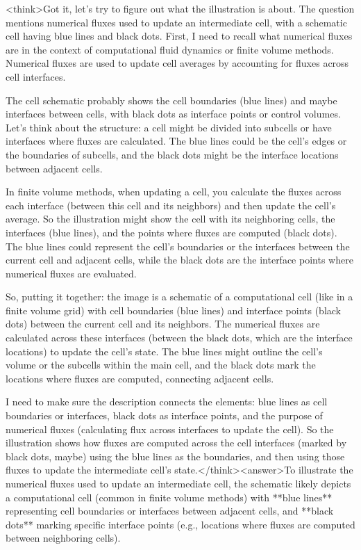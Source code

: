 <think>Got it, let's try to figure out what the illustration is about. The question mentions numerical fluxes used to update an intermediate cell, with a schematic cell having blue lines and black dots. First, I need to recall what numerical fluxes are in the context of computational fluid dynamics or finite volume methods. Numerical fluxes are used to update cell averages by accounting for fluxes across cell interfaces. 

The cell schematic probably shows the cell boundaries (blue lines) and maybe interfaces between cells, with black dots as interface points or control volumes. Let's think about the structure: a cell might be divided into subcells or have interfaces where fluxes are calculated. The blue lines could be the cell's edges or the boundaries of subcells, and the black dots might be the interface locations between adjacent cells. 

In finite volume methods, when updating a cell, you calculate the fluxes across each interface (between this cell and its neighbors) and then update the cell's average. So the illustration might show the cell with its neighboring cells, the interfaces (blue lines), and the points where fluxes are computed (black dots). The blue lines could represent the cell's boundaries or the interfaces between the current cell and adjacent cells, while the black dots are the interface points where numerical fluxes are evaluated. 

So, putting it together: the image is a schematic of a computational cell (like in a finite volume grid) with cell boundaries (blue lines) and interface points (black dots) between the current cell and its neighbors. The numerical fluxes are calculated across these interfaces (between the black dots, which are the interface locations) to update the cell's state. The blue lines might outline the cell's volume or the subcells within the main cell, and the black dots mark the locations where fluxes are computed, connecting adjacent cells. 

I need to make sure the description connects the elements: blue lines as cell boundaries or interfaces, black dots as interface points, and the purpose of numerical fluxes (calculating flux across interfaces to update the cell). So the illustration shows how fluxes are computed across the cell interfaces (marked by black dots, maybe) using the blue lines as the boundaries, and then using those fluxes to update the intermediate cell's state.</think><answer>To illustrate the numerical fluxes used to update an intermediate cell, the schematic likely depicts a computational cell (common in finite volume methods) with **blue lines** representing cell boundaries or interfaces between adjacent cells, and **black dots** marking specific interface points (e.g., locations where fluxes are computed between neighboring cells).  

